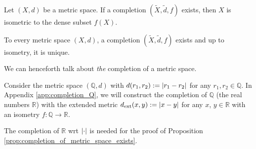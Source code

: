 \begin{remark}
	Let $(X, d)$ be a metric space. If a completion $\left(\tilde{X}, \tilde{d}, f\right)$ exists, then $X$ is isometric to the dense subset $f(X)$.
\end{remark}

\begin{proposition}\label{prop:completion_of_metric_space_exists}
	To every metric space $(X, d)$, a completion $\left(\tilde{X}, \tilde{d}, f\right)$ exists and up to isometry, it is unique.
\end{proposition}

\begin{remark}
	We can henceforth talk about \textit{the} completion of a metric space.
\end{remark}

\begin{exmp}
	Consider the metric space $(\mathbb Q, d)$ with $d(r_1, r_2) := \left\vert r_1 - r_2 \right\vert$ for any $r_1, r_2\in\mathbb Q$. In Appendix \ref{app:completion_Q}, we will construct the completion of $\mathbb Q$ (the real numbers $\mathbb R$) with the extended metric $d_{\text{ext}}(x, y) := \left\vert x - y \right\vert$ for any $x$, $y\in\mathbb R$ with an isometry $f:\mathbb Q\to\mathbb R$.
\end{exmp}

\begin{remark}
	The completion of $\mathbb R$ wrt $\left\vert \cdot \right\vert$ is needed for the proof of Proposition \ref{prop:completion_of_metric_space_exists}.
\end{remark}

